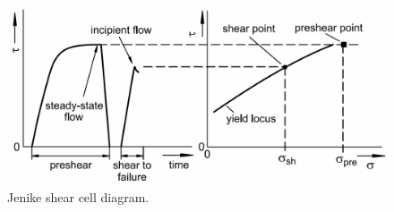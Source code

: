 \begin{figure}[!htb]
\centering
\includegraphics[width=.80\columnwidth]{images/004sjsctdiagram}
\caption[Jenike shear cell diagram]{Jenike shear cell diagram.}
\label{fig:004sjsctdiagram}
\end{figure}